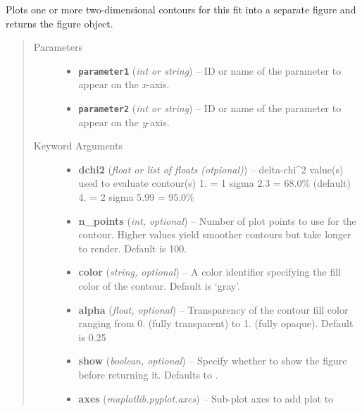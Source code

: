 \documentclass[a4paper,10pt,english]{sphinxmanual}
\begin{document}
\begin{fulllineitems}
\begin{fulllineitems}
\label{module_doc:kafe.fit.Fit.plot_contour}
Plots one or more two-dimensional contours for this fit into
a separate figure and returns the figure object.
\begin{quote}\begin{description}
\item[{Parameters}] \leavevmode\begin{itemize}
\item {} 
\textbf{\texttt{parameter1}} (\emph{int or string}) -- ID or name of the parameter to appear on the \emph{x}-axis.

\item {} 
\textbf{\texttt{parameter2}} (\emph{int or string}) -- ID or name of the parameter to appear on the \emph{y}-axis.

\end{itemize}

\item[{Keyword Arguments}] \leavevmode\begin{itemize}
\item {} 
\textbf{dchi2} (\emph{float or list of floats (otpional)}) --
delta-chi\textasciicircum{}2 value(s) used to evaluate contour(s)
1. = 1 sigma
2.3 = 68.0\% (default)
4.  = 2 sigma
5.99 = 95.0\%

\item {} 
\textbf{n\_points} (\emph{int, optional}) --
Number of plot points to use for the contour. Higher
values yield smoother contours but take longer to
render. Default is 100.

\item {} 
\textbf{color} (\emph{string, optional}) --
A  color identifier specifying the fill color
of the contour. Default is `gray'.

\item {} 
\textbf{alpha} (\emph{float, optional}) --
Transparency of the contour fill color ranging from 0. (fully
transparent) to 1. (fully opaque). Default is 0.25

\item {} 
\textbf{show} (\emph{boolean, optional}) --
Specify whether to show the figure before returning it. Defaults
to .

\item {} 
\textbf{axes} (\emph{maplotlib.pyplot.axes}) --
Sub-plot axes to add plot to


\end{itemize}
\end{description}
\end{quote}
\end{fulllineitems}
\end{fulllineitems}
\end{document}
